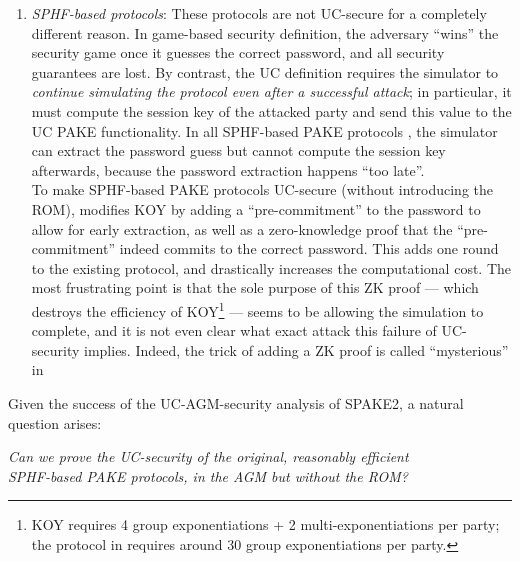 \begin{enumerate}
  \item \emph{SPHF-based protocols}: These protocols are not UC-secure for a completely different reason. In game-based security definition, the adversary ``wins'' the security game once it guesses the correct password, and all security guarantees are lost. By contrast, the UC definition requires the simulator to \emph{continue simulating the protocol even after a successful attack}; in particular, it must compute the session key of the attacked party and send this value to the UC PAKE functionality. In all SPHF-based PAKE protocols \cite{EC:KatOstYun01}, the simulator can extract the password guess but cannot compute the session key afterwards, because the password extraction happens ``too late''. \\
      To make SPHF-based PAKE protocols UC-secure (without introducing the ROM), \cite{EC:CHKLM05} modifies KOY by adding a ``pre-commitment'' to the password to allow for early extraction, as well as a zero-knowledge proof that the ``pre-commitment'' indeed commits to the correct password. This adds one round to the existing protocol, and drastically increases the computational cost. The most frustrating point is that the sole purpose of this ZK proof --- which destroys the efficiency of KOY\footnote{KOY requires 4 group exponentiations + 2 multi-exponentiations per party; the protocol in \cite{EC:CHKLM05} requires around 30 group exponentiations per party.} --- seems to be allowing the simulation to complete, and it is not even clear what exact attack this failure of UC-security implies. Indeed, the trick of adding a ZK proof is called ``mysterious'' in \cite{...}
\end{enumerate}
Given the success of the UC-AGM-security analysis of SPAKE2, a natural question arises:
\begin{displayquote}
\begin{center}
  \emph{Can we prove the UC-security of the original, reasonably efficient \\ SPHF-based PAKE protocols, in the AGM but without the ROM?}
\end{center}
\end{displayquote}

